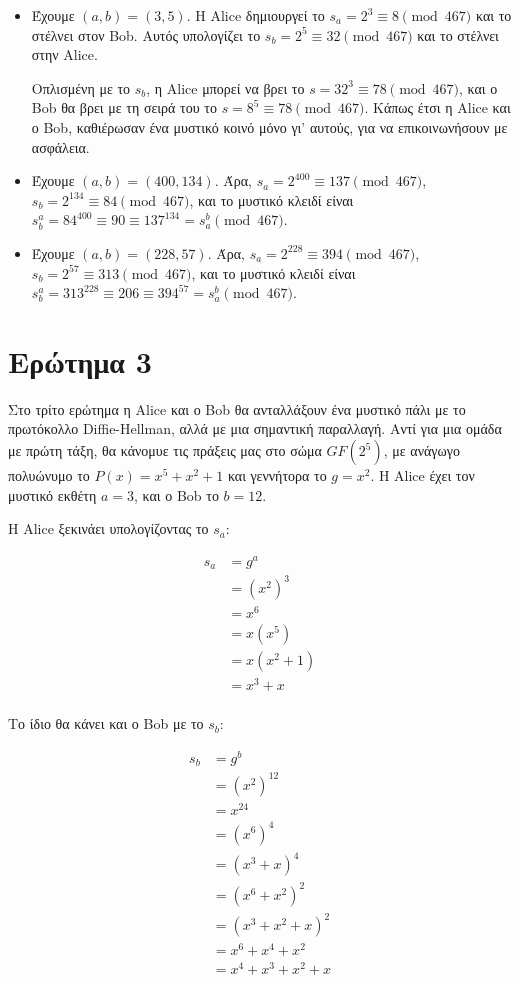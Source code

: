 \documentclass{article}
\begin{document}
\begin{itemize}
    \item Έχουμε $(a, b) = (3, 5)$. Η Alice δημιουργεί το $s_a = 2^3 \equiv 8 \pmod{467}$ και το στέλνει στον Bob. Αυτός υπολογίζει το $s_b = 2^5 \equiv 32 \pmod{467}$ και το στέλνει στην Alice.

    Οπλισμένη με το $s_b$, η Alice μπορεί να βρει το $s = 32^3 \equiv 78 \pmod{467}$, και ο Bob θα βρει με τη σειρά του το $s = 8^5 \equiv 78 \pmod{467}$. Κάπως έτσι η Alice και ο Bob, καθιέρωσαν ένα μυστικό κοινό μόνο γι' αυτούς, για να επικοινωνήσουν με ασφάλεια.

    \item Έχουμε $(a, b) = (400, 134)$. Άρα, $s_a = 2^{400} \equiv 137 \pmod{467}$, $s_b = 2^{134} \equiv 84 \pmod{467}$, και το μυστικό κλειδί είναι $s_b^a = 84^{400} \equiv 90 \equiv 137^{134} = s_a^b \pmod{467}$.

    \item Έχουμε $(a, b) = (228, 57)$. Άρα, $s_a = 2^{228} \equiv 394 \pmod{467}$, $s_b = 2^{57} \equiv 313 \pmod{467}$, και το μυστικό κλειδί είναι $s_b^a = 313^{228} \equiv 206 \equiv 394^{57} = s_a^b \pmod{467}$.
\end{itemize}

\section*{Ερώτημα 3}

Στο τρίτο ερώτημα η Alice και ο Bob θα ανταλλάξουν ένα μυστικό πάλι με το πρωτόκολλο Diffie-Hellman, αλλά με μια σημαντική παραλλαγή. Αντί για μια ομάδα με πρώτη τάξη, θα κάνομυε τις πράξεις μας στο σώμα $GF(2^5)$, με ανάγωγο πολυώνυμο το $P(x) = x^5 + x^2 + 1$ και γεννήτορα το $g = x^2$. Η Alice έχει τον μυστικό εκθέτη $a = 3$, και ο Bob το $b = 12$.

Η Alice ξεκινάει υπολογίζοντας το $s_a$:

\begin{align*}
    s_a
    &= g^a \\
    &= (x^2)^3 \\
    &= x^6 \\
    &= x(x^5) \\
    &= x(x^2 + 1) \\
    &= x^3 + x \\
\end{align*}

Το ίδιο θα κάνει και ο Bob με το $s_b$:

\begin{align*}
    s_b
    &= g^b \\
    &= (x^2)^12 \\
    &= x^24 \\
    &= (x^6)^4 \\
    &= (x^3 + x)^4 \\
    &= (x^6 + x^2)^2 \\
    &= (x^3 + x^2 + x)^2 \\
    &= x^6 + x^4 + x^2 \\
    &= x^4 + x^3 + x^2 + x \\
\end{align*}
\end{document}
